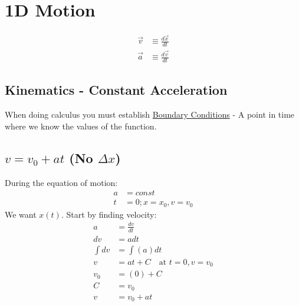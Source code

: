 \documentclass{article}
\begin{document}
\newcommand{\hr}{\par\noindent\rule{\textwidth}{0.4pt}}

\newcommand{\bc}[1]{
	\begin{equation*}
		\begin{boxed}
			{#1}
		\end{boxed}
	\end{equation*}
}

\newcommand{\cond}[2]{
	\ifmmode
		{#1} \quad {#2}
	\else
		$$ {#1} \quad {#2} $$
	\fi
}

\tableofcontents

\section{1D Motion}
\begin{align}
	\vec{v} & \equiv \frac{d\vec{x}}{dt} \\
	\vec{a} & \equiv \frac{d\vec{v}}{dt}
\end{align}

\subsection{Kinematics - Constant Acceleration}
When doing calculus you must establish \underline{Boundary Conditions} - A point in time where we know the values of the function.

\subsection{$ v = v_0 + at $ (No $ \Delta x $)}
During the equation of motion:
\begin{align}
	a & = const \\
	t & = 0; x = x_0, v = v_0
\end{align}
We want $ x(t) $. Start by finding velocity:
\begin{align}
	a & = \frac{dv}{dt} \\
	dv & = adt \\
	\int dv & = \int \left( a \right) dt \\
	v & = at + C \quad \text{at } t = 0, v = v_0 \\
	v_0 & = (0) + C \\
	C & = v_0 \\
	v & = v_0 + at
\end{align}
\end{document}
